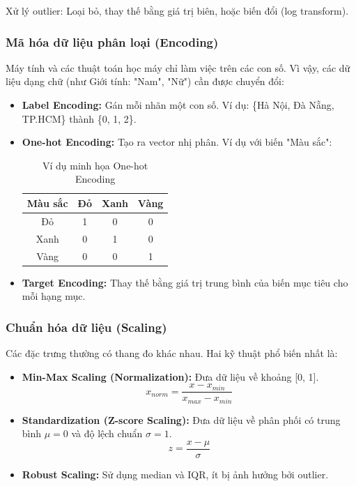 Xử lý outlier: Loại bỏ, thay thế bằng giá trị biên, hoặc biến đổi (log transform).

\subsubsection{Mã hóa dữ liệu phân loại (Encoding)}
Máy tính và các thuật toán học máy chỉ làm việc trên các con số. Vì vậy, các dữ liệu dạng chữ (như Giới tính: "Nam", "Nữ") cần được chuyển đổi:
\begin{itemize}
    \item \textbf{Label Encoding:} Gán mỗi nhãn một con số. Ví dụ: \{Hà Nội, Đà Nẵng, TP.HCM\} thành \{0, 1, 2\}.
    \item \textbf{One-hot Encoding:} Tạo ra vector nhị phân. Ví dụ với biến "Màu sắc":
    \begin{table}[H]
    \centering
    \begin{tabular}{|c|c|c|c|}
    \hline
    \textbf{Màu sắc} & \textbf{Đỏ} & \textbf{Xanh} & \textbf{Vàng} \\ \hline
    Đỏ & 1 & 0 & 0 \\ \hline
    Xanh & 0 & 1 & 0 \\ \hline
    Vàng & 0 & 0 & 1 \\ \hline
    \end{tabular}
    \caption{Ví dụ minh họa One-hot Encoding}
    \end{table}
    \item \textbf{Target Encoding:} Thay thế bằng giá trị trung bình của biến mục tiêu cho mỗi hạng mục.
\end{itemize}

\subsubsection{Chuẩn hóa dữ liệu (Scaling)}
Các đặc trưng thường có thang đo khác nhau. Hai kỹ thuật phổ biến nhất là:
\begin{itemize}
    \item \textbf{Min-Max Scaling (Normalization):} Đưa dữ liệu về khoảng [0, 1].
    \begin{equation}
        x_{norm} = \frac{x - x_{min}}{x_{max} - x_{min}}
    \end{equation}
    \item \textbf{Standardization (Z-score Scaling):} Đưa dữ liệu về phân phối có trung bình $\mu = 0$ và độ lệch chuẩn $\sigma = 1$.
    \begin{equation}
        z = \frac{x - \mu}{\sigma}
    \end{equation}
    \item \textbf{Robust Scaling:} Sử dụng median và IQR, ít bị ảnh hưởng bởi outlier.
\end{itemize}

